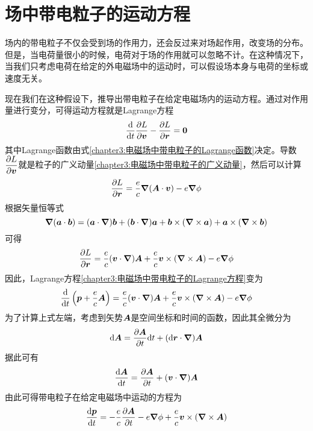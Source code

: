 \section{场中带电粒子的运动方程}\label{chapter3:section:场中带电粒子的运动方程}

场内的带电粒子不仅会受到场的作用力，还会反过来对场起作用，改变场的分布。但是，当电荷量很小的时候，电荷对于场的作用就可以忽略不计。在这种情况下，当我们只考虑电荷在给定的外电磁场中的运动时，可以假设场本身与电荷的坐标或速度无关。

现在我们在这种假设下，推导出带电粒子在给定电磁场内的运动方程。通过对作用量进行变分，可得运动方程就是Lagrange方程
\begin{equation}
	\frac{\mathrm{d}}{\mathrm{d} t} \frac{\partial L}{\partial \boldsymbol{v}} - \frac{\partial L}{\partial \boldsymbol{r}} = \boldsymbol{0}
	\label{chapter3:电磁场中带电粒子的Lagrange方程}
\end{equation}
其中Lagrange函数由式\eqref{chapter3:电磁场中带电粒子的Lagrange函数}决定。导数$\dfrac{\partial L}{\partial \boldsymbol{v}}$就是粒子的广义动量\eqref{chapter3:电磁场中带电粒子的广义动量}，然后可以计算
\begin{equation*}
	\frac{\partial L}{\partial \boldsymbol{r}} = \dfrac{e}{c}\boldsymbol{\nabla} (\boldsymbol{A}\cdot \boldsymbol{v}) - e\boldsymbol{\nabla} \phi
\end{equation*}
根据矢量恒等式
\begin{equation*}
	\boldsymbol{\nabla} (\boldsymbol{a}\cdot \boldsymbol{b}) = (\boldsymbol{a}\cdot \boldsymbol{\nabla})\boldsymbol{b} + (\boldsymbol{b}\cdot \boldsymbol{\nabla})\boldsymbol{a} + \boldsymbol{b}\times (\boldsymbol{\nabla} \times \boldsymbol{a}) + \boldsymbol{a}\times (\boldsymbol{\nabla} \times \boldsymbol{b})
\end{equation*}
可得
\begin{equation*}
	\frac{\partial L}{\partial \boldsymbol{r}} = \dfrac{e}{c}(\boldsymbol{v}\cdot \boldsymbol{\nabla})\boldsymbol{A} + \dfrac{e}{c}\boldsymbol{v}\times (\boldsymbol{\nabla} \times \boldsymbol{A}) - e\boldsymbol{\nabla} \phi
\end{equation*}
因此，Lagrange方程\eqref{chapter3:电磁场中带电粒子的Lagrange方程}变为
\begin{equation*}
	\frac{\mathrm{d}}{\mathrm{d} t}\left(\boldsymbol{p}+\dfrac{e}{c}\boldsymbol{A}\right) = \dfrac{e}{c}(\boldsymbol{v}\cdot \boldsymbol{\nabla})\boldsymbol{A} + \dfrac{e}{c}\boldsymbol{v}\times (\boldsymbol{\nabla} \times \boldsymbol{A}) - e\boldsymbol{\nabla} \phi
\end{equation*}
为了计算上式左端，考虑到矢势$\boldsymbol{A}$是空间坐标和时间的函数，因此其全微分为
\begin{equation*}
	\mathrm{d} \boldsymbol{A} = \frac{\partial \boldsymbol{A}}{\partial t}\mathrm{d} t + (\mathrm{d} \boldsymbol{r}\cdot \boldsymbol{\nabla}) \boldsymbol{A}
\end{equation*}
据此可有
\begin{equation*}
	\frac{\mathrm{d} \boldsymbol{A}}{\mathrm{d} t} = \frac{\partial \boldsymbol{A}}{\partial t} + (\boldsymbol{v}\cdot \boldsymbol{\nabla})\boldsymbol{A}
\end{equation*}
由此可得带电粒子在给定电磁场中运动的方程为
\begin{equation}
	\frac{\mathrm{d} \boldsymbol{p}}{\mathrm{d} t} = -\dfrac{e}{c}\frac{\partial \boldsymbol{A}}{\partial t} - e\boldsymbol{\nabla} \phi + \dfrac{e}{c}\boldsymbol{v}\times (\boldsymbol{\nabla} \times \boldsymbol{A})
	\label{chapter3:带电粒子在给定电磁场中的运动方程}
\end{equation}

